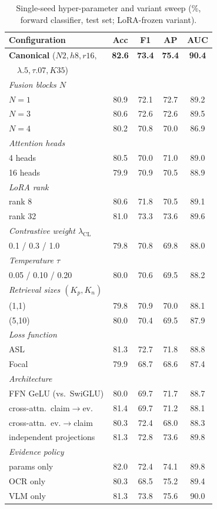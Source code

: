 \documentclass[letterpaper]{article}
\newcommand{\best}[1]{\textbf{#1}}
\begin{document}
\begin{table}[t]
\centering\small
\setlength{\tabcolsep}{5pt}
\begin{tabular}{lcccc}
\toprule
Configuration & Acc & F1 & AP & AUC \\
\midrule
\textbf{Canonical} ($N2,h8,r16,$ & \best{82.6} & \best{73.4} & \best{75.4} & \best{90.4} \\
\ \ $\lambda.5,\tau.07,K35$) & & & & \\
\multicolumn{5}{l}{\emph{Fusion blocks $N$}} \\
$N{=}1$ & 80.9 & 72.1 & 72.7 & 89.2 \\
$N{=}3$ & 80.6 & 72.6 & 72.6 & 89.5 \\
$N{=}4$ & 80.2 & 70.8 & 70.0 & 86.9 \\
\multicolumn{5}{l}{\emph{Attention heads}} \\
4 heads & 80.5 & 70.0 & 71.0 & 89.0 \\
16 heads & 79.9 & 70.9 & 70.5 & 88.9 \\
\multicolumn{5}{l}{\emph{LoRA rank}} \\
rank 8 & 80.6 & 71.8 & 70.5 & 89.1 \\
rank 32 & 81.0 & 73.3 & 73.6 & 89.6 \\
\multicolumn{5}{l}{\emph{Contrastive weight $\lambda_{\mathrm{CL}}$}} \\
0.1 / 0.3 / 1.0 & 79.8 & 70.8 & 69.8 & 88.0 \\
\multicolumn{5}{l}{\emph{Temperature $\tau$}} \\
0.05 / 0.10 / 0.20 & 80.0 & 70.6 & 69.5 & 88.2 \\
\multicolumn{5}{l}{\emph{Retrieval sizes $(K_p,K_n)$}} \\
(1,1) & 79.8 & 70.9 & 70.0 & 88.1 \\
(5,10) & 80.0 & 70.4 & 69.5 & 87.9 \\
\multicolumn{5}{l}{\emph{Loss function}} \\
ASL & 81.3 & 72.7 & 71.8 & 88.8 \\
Focal & 79.9 & 68.7 & 68.6 & 87.4 \\
\multicolumn{5}{l}{\emph{Architecture}} \\
FFN GeLU (vs.\ SwiGLU) & 80.0 & 69.7 & 71.7 & 88.7 \\
cross-attn.\ claim$\to$ev. & 81.4 & 69.7 & 71.2 & 88.1 \\
cross-attn.\ ev.$\to$claim & 80.3 & 72.4 & 68.0 & 88.3 \\
independent projections & 81.3 & 72.8 & 73.6 & 89.8 \\
\multicolumn{5}{l}{\emph{Evidence policy}} \\
params only & 82.0 & 72.4 & 74.1 & 89.8 \\
OCR only & 80.3 & 68.5 & 75.2 & 89.4 \\
VLM only & 81.3 & 73.8 & 75.6 & 90.0 \\
\bottomrule
\end{tabular}
\caption{Single-seed hyper-parameter and variant sweep (\%, forward classifier, test set; LoRA-frozen variant).}
\label{tab:sweep}
\end{table}
\end{document}
